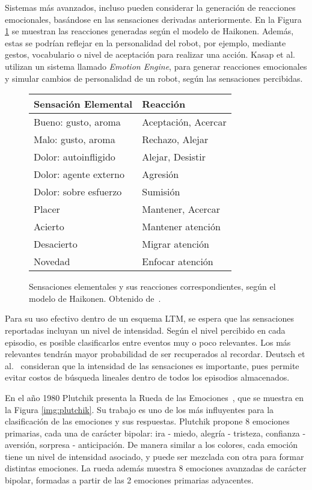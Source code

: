 Sistemas más avanzados, incluso pueden considerar la generación de reacciones emocionales, basándose en las sensaciones derivadas anteriormente. En la Figura \ref{img:emotional_haikonen} se muestran las reacciones generadas según el modelo de Haikonen. Además, estas se podrían reflejar en la personalidad del robot, por ejemplo, mediante gestos, vocabulario o nivel de aceptación para realizar una acción. Kasap et al.~\cite{Kasap2010} utilizan un sistema llamado \textit{Emotion Engine}, para generar reacciones emocionales y simular cambios de personalidad de un robot, según las sensaciones percibidas.

\begin{figure}[!ht]
	\centering
	\begin{tabular}{| l | l |}
		\hline
		\rowcolor{gray!50}
		Sensación Elemental & Reacción  \\ 
		\hline Bueno: gusto, aroma & Aceptación, Acercar \\ 
		\hline Malo: gusto, aroma & Rechazo, Alejar \\ 
		\hline Dolor: autoinfligido  & Alejar, Desistir \\ 
		\hline Dolor: agente externo & Agresión \\ 
		\hline Dolor: sobre esfuerzo & Sumisión \\ 
		\hline Placer & Mantener, Acercar \\ 
		\hline Acierto & Mantener atención \\ 
		\hline Desacierto & Migrar atención \\ 
		\hline Novedad & Enfocar atención \\ 
		\hline 
	\end{tabular} 
	\caption{\small Sensaciones elementales y sus reacciones correspondientes, según el modelo de Haikonen. Obtenido de~\cite{Dodd2005}.}
	\label{img:emotional_haikonen}
\end{figure}

Para su uso efectivo dentro de un esquema LTM, se espera que las sensaciones reportadas incluyan un nivel de intensidad. Según el nivel percibido en cada episodio, es posible clasificarlos entre eventos muy o poco relevantes. Los más relevantes tendrán mayor probabilidad de ser recuperados al recordar. Deutsch et al.~\cite{Deutsch2008} consideran que la intensidad de las sensaciones es importante, pues permite evitar costos de búsqueda lineales dentro de todos los episodios almacenados.

En el año 1980 Plutchik presenta la Rueda de las Emociones~\cite{plutchik1980}, que se muestra en la Figura \ref{img:plutchik}. Su trabajo es uno de los más influyentes para la clasificación de las emociones y sus respuestas. Plutchik propone 8 emociones primarias, cada una de carácter bipolar: ira - miedo, alegría - tristeza, confianza - aversión, sorpresa - anticipación. De manera similar a los colores, cada emoción tiene un nivel de intensidad asociado, y puede ser mezclada con otra para formar distintas emociones. La rueda además muestra 8 emociones avanzadas de carácter bipolar, formadas a partir de las 2 emociones primarias adyacentes.

